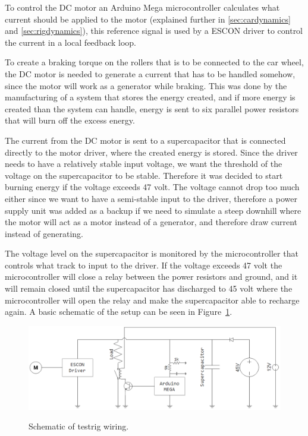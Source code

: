 To control the DC motor an Arduino Mega microcontroller
calculates what current should be applied to the motor (explained further in \ref{sec:cardynamics} and \ref{sec:rigdynamics}), this reference signal
is used by a ESCON driver to control the current in a local feedback loop.

To create a braking torque on the rollers that is to be connected to the car wheel, the DC motor is needed to generate a current
that has to be handled somehow, since the motor will work as
a generator while braking. This was done by the manufacturing of a system that
stores the energy created, and if more energy is created than the system can
handle, energy is sent to six parallel power resistors that will burn off the
excess energy. 

The current from the DC motor is sent to a supercapacitor that is connected
directly to the motor driver, where the created energy is stored. Since the
driver needs to have a relatively stable input voltage, we want the threshold
of the voltage on the supercapacitor to be stable. Therefore it was decided to
start burning energy if the voltage exceeds 47 volt. The voltage cannot drop
too much either since we want to have a semi-stable input to the driver, therefore a power supply unit was added as a backup if we need
to simulate a steep downhill where the motor will act as a motor instead of a
generator, and therefore draw current instead of generating. 

The voltage level on the supercapacitor is monitored by the microcontroller
that controls what track to input to the driver. If the voltage exceeds 47 volt
the microcontroller will close a relay between the power resistors and ground,
and it will remain closed until the supercapacitor has discharged to 45 volt where
the microcontroller will open the relay and make the supercapacitor able to
recharge again. A basic schematic of the setup can be seen in
Figure~\ref{fig:testrig_schematic}.

\begin{figure}[H]
    \centering\label{fig:testrig_schematic}
    \includegraphics[width=\textwidth]{./img/testrig_schematic.png}
    \caption{Schematic of testrig wiring.}
\end{figure}

